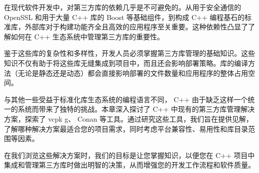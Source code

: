在现代软件开发中，对第三方库的依赖几乎是不可避免的。从用于安全通信的 OpenSSL 和用于大量 C++ 库的 Boost 等基础组件，到构成 C++ 编程基石的标准库，外部库对于构建功能齐全且高效的应用程序至关重要。这种依赖性凸显了了解如何在 C++ 生态系统中管理第三方库的重要性。

鉴于这些库的复杂性和多样性，开发人员必须掌握第三方库管理的基础知识。这些知识不仅有助于将这些库无缝集成到项目中，而且还会影响部署策略。库的编译方法（无论是静态还是动态）都会直接影响部署的文件数量和应用程序的整体占用空间。

与其他一些受益于标准化库生态系统的编程语言不同， C++ 由于缺乏这样一个统一的系统而带来了独特的挑战。本章深入探讨了 C++ 中现有的第三方库管理解决方案，探索了 vcpk g、 Conan 等工具。通过研究这些工具，我们旨在提供见解，了解哪种解决方案最适合您的项目需求，同时考虑平台兼容性、易用性和库目录范围等因素。

在我们浏览这些解决方案时，我们的目标是让您掌握知识，以便您在 C++ 项目中集成和管理第三方库时做出明智的决策，从而增强您的开发工作流程和软件质量。